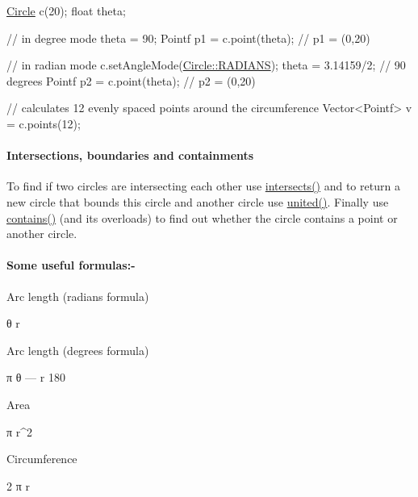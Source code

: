 \begin{DoxyCode}
\hyperlink{classprism_1_1_circle_aff41793f64e90d15a4d89851b1a6b011}{Circle} c(20);
\textcolor{keywordtype}{float} theta;

\textcolor{comment}{// in degree mode}
theta = 90;
Pointf p1 = c.point(theta); \textcolor{comment}{// p1 = (0,20)}

\textcolor{comment}{// in radian mode}
c.setAngleMode(\hyperlink{classprism_1_1_circle_a74c7c532b4eb120b9227b7fabeffe6aca4e738ac91c0d446d1cd6c0ee11a7baaf}{Circle::RADIANS});
theta = 3.14159/2; \textcolor{comment}{// 90 degrees}
Pointf p2 = c.point(theta); \textcolor{comment}{// p2 = (0,20)}

\textcolor{comment}{// calculates 12 evenly spaced points around the circumference}
Vector<Pointf> v = c.points(12);
\end{DoxyCode}


\paragraph*{Intersections, boundaries and containments}

To find if two circles are intersecting each other use \hyperlink{classprism_1_1_circle_a2c9d9c17e0e094eac55f74398986b940}{intersects()} and to return a new circle that bounds this circle and another circle use \hyperlink{classprism_1_1_circle_a8e34ff5188e91cfe080264e106909f6e}{united()}. Finally use \hyperlink{classprism_1_1_circle_aafcedb559b7bbba00cfd84fab7378801}{contains()} (and its overloads) to find out whether the circle contains a point or another circle.

\paragraph*{Some useful formulas\+:-\/}

Arc length (radians formula) 
\begin{DoxyCode}
θ r
\end{DoxyCode}


Arc length (degrees formula) 
\begin{DoxyCode}
   π
θ --- r
  180
\end{DoxyCode}


Area 
\begin{DoxyCode}
π r^2
\end{DoxyCode}


Circumference 
\begin{DoxyCode}
2 π r
\end{DoxyCode}


